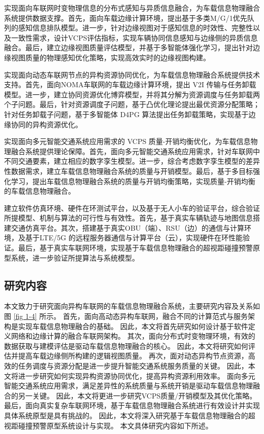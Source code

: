  实现面向车联网时变物理信息的分布式感知与异质信息融合，为车载信息物理融合系统提供数据支撑。首先，面向车载边缘计算环境，提出基于多类M/G/1优先队列的感知信息排队模型。进一步，针对边缘视图对于感知信息的时效性、完整性以及一致性需求，设计VCPS评估指标，实现车辆协同信息感知与边缘侧的异质信息融合。最后，建立边缘视图质量评估模型，并基于多智能体强化学习，提出针对边缘视图质量的物理感知优化策略，实现高效实时的边缘视图构建。

 实现面向动态车联网节点的异构资源协同优化，为车载信息物理融合系统提供技术支持。首先，面向NOMA车联网的车载边缘计算环境，提出 V2I 传输与任务卸载模型。进一步，建立协同资源优化博弈模型，并将其分解为资源调度与任务卸载两个子问题。最后，针对资源调度子问题，基于凸优化理论提出最优资源分配策略；针对任务卸载子问题，基于多智能体 D4PG 算法提出任务卸载策略，实现基于边缘协同的异构资源优化。

 实现面向多元智能交通系统应用需求的 VCPS 质量-开销均衡优化，为车载信息物理融合系统提供理论保障。首先，面向多元智能交通系统应用需求，针对车联网中不同交通要素，建立相应的数字孪生模型。进一步，综合考虑数字孪生模型的差异性数据需求，建立车载信息物理融合系统的质量与开销模型。最后，基于多目标强化学习，提出车载信息物理融合系统的质量与开销均衡策略，实现质量-开销均衡的车载信息物理融合。

 建立软件仿真环境、硬件在环测试平台，以及基于无人小车的验证平台，综合验证所提模型、机制与算法的可行性与有效性。首先，基于真实车辆轨迹与地图信息搭建交通仿真平台。其次，搭建基于真实OBU（端）、RSU（边）的通信与计算环境，及基于LTE/5G 的远程服务器通信与计算平台（云），实现硬件在环性能验证。最后，基于真实车联网环境，实现基于车载信息物理融合的超视距碰撞预警原型系统，进一步验证所提算法与系统模型。

\subsection{研究内容}

本文致力于研究面向异构车联网的车载信息物理融合系统，主要研究内容及关系如图 \ref{fig 1-4} 所示。
首先，面向高动态异构车联网，融合不同的计算范式与服务架构是实现车载信息物理融合的基础。
因此，本文将首先研究如何设计基于软件定义网络和边缘计算的融合车联网架构。
其次，面向分布式时变物理环境，有效的数据获取与建模评估是驱动车载信息物理融合的核心。
因此，本文将研究如何评估并提高车载边缘侧所构建的逻辑视图质量。
再次，面对动态异构节点资源，高效的任务调度与资源分配是进一步提升智能交通系统服务质量的关键。
因此，本文将进一步研究如何实现异构资源协同优化，提高异构资源利用效率。
面向多元智能交通系统应用需求，满足差异性的系统质量与系统开销是驱动车载信息物理融合的另一关键。
因此，本文将更进一步研究VCPS质量/开销模型及其优化策略。
最后，面向真实复杂车联网环境，基于车载信息物理融合系统进行有效设计并实现具体系统原型是具有挑战的。
因此，本文将深入研究基于车载信息物理融合的超视距碰撞预警原型系统设计与实现。
本文具体研究内容如下所述。

